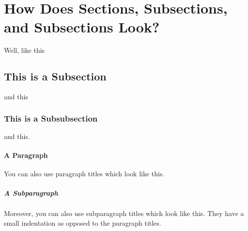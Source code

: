 \section{How Does Sections, Subsections, and Subsections Look?}
Well, like this
\subsection{This is a Subsection}
and this
\subsubsection{This is a Subsubsection}
and this.

\paragraph{A Paragraph}
You can also use paragraph titles which look like this.

\subparagraph{A Subparagraph} Moreover, you can also use subparagraph titles which look like this. They have a small indentation as opposed to the paragraph titles.

